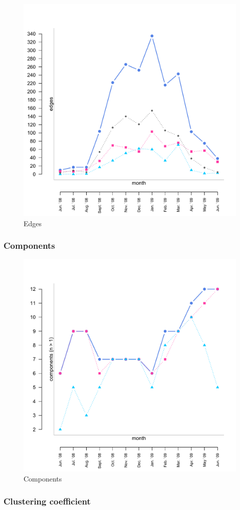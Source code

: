 \begin{figure}[htpb]
\begin{center}
  \includegraphics[width=.6\textwidth]{assets/pdf/long_edges.pdf}
  \caption[Edges]{Edges}
  \label{fig:long_edges}
\end{center}
\end{figure} 


\subsubsection*{Components}

\begin{figure}[htpb]
\begin{center}
  \includegraphics[width=.6\textwidth]{assets/pdf/long_comps.pdf}
  \caption[Components]{Components}
  \label{fig:long_comps}
\end{center}
\end{figure} 


\subsubsection*{Clustering coefficient}

